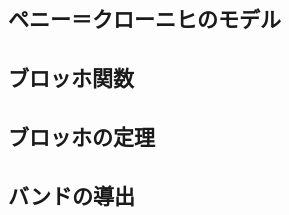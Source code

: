         \subsection{ペニー＝クローニヒのモデル}

        \subsection{ブロッホ関数}

        \subsection{ブロッホの定理}

        \subsection{バンドの導出}
